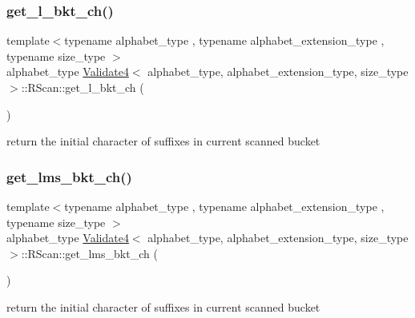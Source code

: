\subsubsection{\texorpdfstring{get\+\_\+l\+\_\+bkt\+\_\+ch()}{get\_l\_bkt\_ch()}}
{\footnotesize\ttfamily template$<$typename alphabet\+\_\+type , typename alphabet\+\_\+extension\+\_\+type , typename size\+\_\+type $>$ \\
alphabet\+\_\+type \hyperlink{class_validate4}{Validate4}$<$ alphabet\+\_\+type, alphabet\+\_\+extension\+\_\+type, size\+\_\+type $>$\+::R\+Scan\+::get\+\_\+l\+\_\+bkt\+\_\+ch (\begin{DoxyParamCaption}{ }\end{DoxyParamCaption})\hspace{0.3cm}{\ttfamily [inline]}}



return the initial character of suffixes in current scanned bucket 

\mbox{\label{struct_validate4_1_1_r_scan_ac53c6318e14f774d956baea8134b5937}} 
\subsubsection{\texorpdfstring{get\+\_\+lms\+\_\+bkt\+\_\+ch()}{get\_lms\_bkt\_ch()}}
{\footnotesize\ttfamily template$<$typename alphabet\+\_\+type , typename alphabet\+\_\+extension\+\_\+type , typename size\+\_\+type $>$ \\
alphabet\+\_\+type \hyperlink{class_validate4}{Validate4}$<$ alphabet\+\_\+type, alphabet\+\_\+extension\+\_\+type, size\+\_\+type $>$\+::R\+Scan\+::get\+\_\+lms\+\_\+bkt\+\_\+ch (\begin{DoxyParamCaption}{ }\end{DoxyParamCaption})\hspace{0.3cm}{\ttfamily [inline]}}



return the initial character of suffixes in current scanned bucket 

\mbox{\label{struct_validate4_1_1_r_scan_adf0c72967eddde6a6924472a16e92e95}} 
